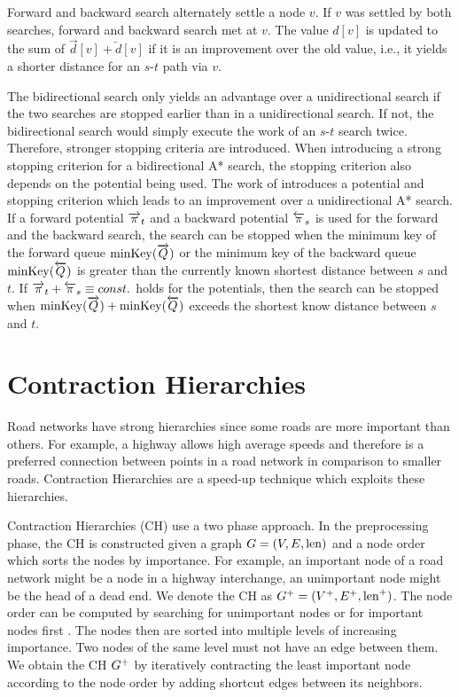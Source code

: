 Forward and backward search alternately settle a node $v$. If $v$ was settled by both searches, forward and backward search met at $v$. The value $d[v]$ is updated to the sum of $\overrightarrow{d}[v] + \overleftarrow{d}[v]$ if it is an improvement over the old value, i.e., it yields a shorter distance for an $s$-$t$ path via $v$.

The bidirectional search only yields an advantage over a unidirectional search if the two searches are stopped earlier than in a unidirectional search. If not, the bidirectional search would simply execute the work of an $s$-$t$ search twice. Therefore, stronger stopping criteria are introduced. When introducing a strong stopping criterion for a bidirectional A* search, the stopping criterion also depends on the potential being used. The work of \cite{goldberg:2005a} introduces a potential and stopping criterion which leads to an improvement over a unidirectional A* search. If a forward potential $\overrightarrow{\pi}_t$ and a backward potential $\overleftarrow{\pi}_s$ is used for the forward and the backward search, the search can be stopped when the minimum key of the forward queue $\operatorname{minKey}(\overrightarrow{Q})$ or the minimum key of the backward queue $\operatorname{minKey}(\overleftarrow{Q})$ is greater than the currently known shortest distance between $s$ and $t$. If $\overrightarrow{\pi}_t + \overleftarrow{\pi}_s \equiv const.$ holds for the potentials, then the search can be stopped when $\operatorname{minKey}(\overrightarrow{Q}) + \operatorname{minKey}(\overleftarrow{Q})$ exceeds the shortest know distance between $s$ and $t$.

\section{Contraction Hierarchies\label{sec:ch}}
Road networks have strong hierarchies since some roads are more important than others. For example, a highway allows high average speeds and therefore is a preferred connection between points in a road network in comparison to smaller roads. Contraction Hierarchies \cite{geisberger:2012} are a speed-up technique which exploits these hierarchies.

Contraction Hierarchies (CH) use a two phase approach. In the preprocessing phase, the CH is constructed given a graph $G=(V,E,\operatorname{len})$ and a node order which sorts the nodes by importance. For example, an important node of a road network might be a node in a highway interchange, an unimportant node might be the head of a dead end. We denote the CH as $G^+ = (V^+,E^+,\operatorname{len}^+)$. The node order can be computed by searching for unimportant nodes \cite{geisberger:2012} or for important nodes first \cite{abraham:2012,delling:2014}. The nodes then are sorted into multiple levels of increasing importance. Two nodes of the same level must not have an edge between them. We obtain the CH $G^+$ by iteratively contracting the least important node according to the node order by adding shortcut edges between its neighbors.

